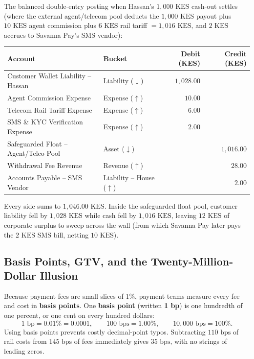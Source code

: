 The balanced double-entry posting when Hassan's $1{,}000\text{ KES}$ cash-out settles (where the external agent/telecom pool deducts the $1{,}000\text{ KES}$ payout plus $10\text{ KES}$ agent commission plus $6\text{ KES}$ rail tariff $= 1{,}016\text{ KES}$, and $2\text{ KES}$ accrues to Savanna Pay's SMS vendor):

\begin{center}
\small
\begin{tabular}{llrr}
\toprule
\textbf{Account} & \textbf{Bucket} & \textbf{Debit (KES)} & \textbf{Credit (KES)} \\
\midrule
Customer Wallet Liability -- Hassan & Liability ($\downarrow$) & $1{,}028.00$ & \\
Agent Commission Expense & Expense ($\uparrow$) & $10.00$ & \\
Telecom Rail Tariff Expense & Expense ($\uparrow$) & $6.00$ & \\
SMS \& KYC Verification Expense & Expense ($\uparrow$) & $2.00$ & \\
Safeguarded Float -- Agent/Telco Pool & Asset ($\downarrow$) & & $1{,}016.00$ \\
Withdrawal Fee Revenue & Revenue ($\uparrow$) & & $28.00$ \\
Accounts Payable -- SMS Vendor & Liability -- House ($\uparrow$) & & $2.00$ \\
\bottomrule
\end{tabular}
\end{center}

Every side sums to $1{,}046.00\text{ KES}$. Inside the safeguarded float pool, customer liability fell by $1{,}028\text{ KES}$ while cash fell by $1{,}016\text{ KES}$, leaving $12\text{ KES}$ of corporate surplus to sweep across the wall (from which Savanna Pay later pays the $2\text{ KES}$ SMS bill, netting $10\text{ KES}$).

\subsection{Basis Points, GTV, and the Twenty-Million-Dollar Illusion}

Because payment fees are small slices of $1\%$, payment teams measure every fee and cost in \textbf{basis points}. One \textbf{basis point} (written \textbf{1 bp}) is one hundredth of one percent, or one cent on every hundred dollars:
\[
  1\text{ bp} = 0.01\% = 0.0001, \qquad 100\text{ bps} = 1.00\%, \qquad 10{,}000\text{ bps} = 100\%.
\]
Using basis points prevents costly decimal-point typos. Subtracting $110\text{ bps}$ of rail costs from $145\text{ bps}$ of fees immediately gives $35\text{ bps}$, with no strings of leading zeros.


